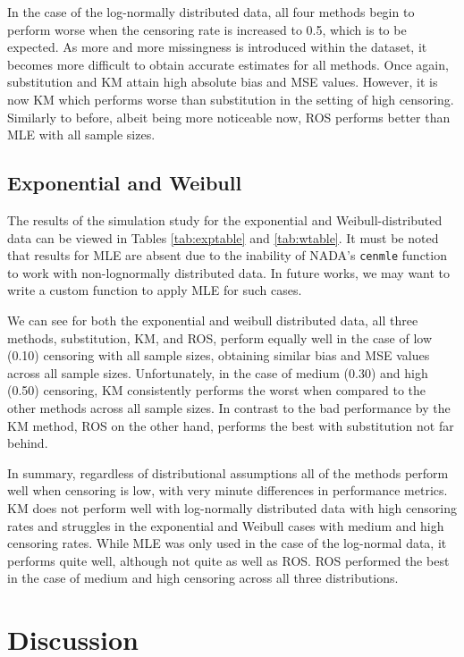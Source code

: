 \documentclass[12pt, twoside]{amherstthesis}
\begin{document}
In the case of the log-normally distributed data, all four methods begin to perform worse when the censoring rate is increased to 0.5, which is to be expected. As more and more missingness is introduced within the dataset, it becomes more difficult to obtain accurate estimates for all methods. Once again, substitution and KM attain high absolute bias and MSE values. However, it is now KM which performs worse than substitution in the setting of high censoring. Similarly to before, albeit being more noticeable now, ROS performs better than MLE with all sample sizes.

\hypertarget{exponentialweibullsimstudy}{%
\subsection{Exponential and Weibull}\label{exponentialweibullsimstudy}}

The results of the simulation study for the exponential and Weibull-distributed data can be viewed in Tables \ref{tab:exptable} and \ref{tab:wtable}. It must be noted that results for MLE are absent due to the inability of NADA's \texttt{cenmle} function to work with non-lognormally distributed data. In future works, we may want to write a custom function to apply MLE for such cases.

We can see for both the exponential and weibull distributed data, all three methods, substitution, KM, and ROS, perform equally well in the case of low (0.10) censoring with all sample sizes, obtaining similar bias and MSE values across all sample sizes. Unfortunately, in the case of medium (0.30) and high (0.50) censoring, KM consistently performs the worst when compared to the other methods across all sample sizes. In contrast to the bad performance by the KM method, ROS on the other hand, performs the best with substitution not far behind.

In summary, regardless of distributional assumptions all of the methods perform well when censoring is low, with very minute differences in performance metrics. KM does not perform well with log-normally distributed data with high censoring rates and struggles in the exponential and Weibull cases with medium and high censoring rates. While MLE was only used in the case of the log-normal data, it performs quite well, although not quite as well as ROS. ROS performed the best in the case of medium and high censoring across all three distributions.

\hypertarget{discussion}{%
\section{Discussion}\label{discussion}}
\end{document}
